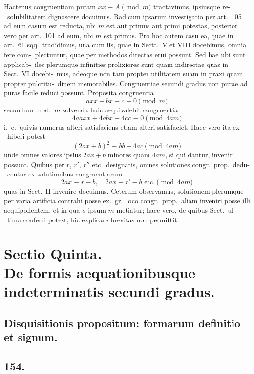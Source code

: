 \documentclass[12pt,a4paper]{article}
\theoremstyle{plain}
\theoremstyle{definition}
\theoremstyle{remark}
\begin{document}
Hactenus congruentiam puram $xx \equiv A \pmod{m}$ tractavimus, ipsiusque re-\ solubilitatem dignoscere docuimus. Radicum ipsarum investigatio per art.~105 ad
eum casum est reducta, ubi $m$ est aut primus aut primi potestas, posterior vero
per art.~101 ad eum, ubi $m$ est primus. Pro hoc autem casu ea, quae in art.~61
sqq.\ tradidimus, una cum iis, quae in Sectt.\ V et VIII docebimus, omnia fere com-\ plectuntur, quae per methodos directas erui possunt. Sed hae ubi sunt applicab-\ iles plerumque infinities prolixiores sunt quam indirectae quas in Sect.\ VI docebi-\ mus, adeoque non tam propter utilitatem suam in praxi quam propter pulcritu-\ dinem memorabiles. Congruentiae secundi gradus non purae ad puras facile reduci
possunt. Proposita congruentia
\[
axx + bx + c \equiv 0 \pmod{m}
\]
secundum mod.\ $m$ solvenda huic aequivalebit congruentia
\[
4aaxx + 4abx + 4ac \equiv 0 \pmod{4am}
\]
i.~e.\ quivis numerus alteri satisfaciens etiam alteri satisfaciet. Haec vero ita ex-\ hiberi potest
\[
(2ax + b)^2 \equiv bb - 4ac \pmod{4am}
\]
unde omnes valores ipsius $2ax + b$ minores quam $4am$, si qui dantur, inveniri
possunt. Quibus per $r$, $r'$, $r''$ etc.\ designatis, omnes solutiones congr.\ prop.\ dedu-\ centur ex solutionibus congruentiarum
\[
2ax \equiv r - b,\quad 2ax \equiv r' - b \text{ etc.} \pmod{4am}
\]
quas in Sect.\ II invenire docuimus. Ceterum observamus, solutionem plerumque
per varia artificia contrahi posse ex.\ gr.\ loco congr.\ prop.\ aliam inveniri posse
illi aequipollentem, et in qua $a$ ipsum $m$ metiatur; haec vero, de quibus Sect.\ ul-\ tima conferri potest, hic explicare brevitas non permittit.



\section*{Sectio Quinta.\\ De formis aequationibusque indeterminatis secundi gradus.}

\subsection*{Disquisitionis propositum: formarum definitio et signum.}

\subsection*{154.}
\end{document}
